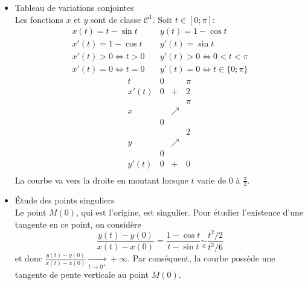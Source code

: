 {\begin{enumerate}
{\begin{itemize}
La fonction $x$ étant impaire et $y$ paire, on restreint l'étude à $[0;\pi]$ 
puis on complète par symétrie par rapport à l'axe $(Oy)$. \\
 puis on complète
en utilisant successivement la symétrie par rapport à $(Oy)$, puis des translations successives 
de vecteur $2\pi\cdot\vec{i}$.
\item Tableau de variations conjointes\\
Les fonctions $x$ et $y$ sont de classe $\mathcal{C}^1$. Soit $t\in[0;\pi]$:
$$\begin{array}{lcl}
x(t)=t-\sin t&\ &y(t)=1-\cos t\\
x'(t)=1-\cos t&\ &y'(t)=\sin t\\
x'(t)>0\Longleftrightarrow t>0&\ &y'(t)>0\Longleftrightarrow 0<t<\pi\\
x'(t)=0\Longleftrightarrow t=0 &\ &y'(t)=0\Longleftrightarrow t\in\{0;\pi\}
\end{array}$$
$$\begin{array}{c|lcr}
t&0&\ &\pi\\\hline
x'(t)&0&+&2 \\\hline
\ &  &\ &\pi \\
x&\ &\nearrow &\ \\
\ &0 &\ & \\\hline
\ & &\ & 2\\
y&\ &\nearrow &\ \\
\ &0 &\ & \\\hline
y'(t)&0& + &0\ \\
\end{array}$$
La courbe va vers la droite en montant lorsque $t$ varie de $0$ à $\frac\pi2$.
\item \'Etude des points singuliers\\
Le point $M(0)$, qui est l'origine, est singulier. Pour étudier l'existence d'une tangente en ce point, on considère
$$\frac{y(t)-y(0)}{x(t)-x(0)}=\frac{1-\cos t}{t-\sin t}\underset{0}{\sim}\frac{t^2/2}{t^3/6}$$
et donc $\frac{y(t)-y(0)}{x(t)-x(0)}\xrightarrow[t\to 0^+]{}+\infty$. Par conséquent, la courbe possède une tangente de pente verticale au point $M(0)$.
\end{itemize}

\begin{center}
\end{center}}
\end{enumerate}}
